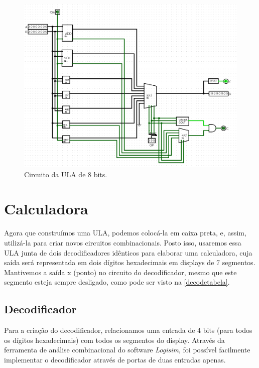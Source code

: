 \documentclass[
	12pt,				%
	openright,			%
	twoside,			%
	a4paper,			%
	english,			%
	french,				%
	spanish,			%
	brazil,				%
	]{abntex2}
\begin{document}
\begin{figure}[H]
	\begin{center}
	    \includegraphics[scale=0.4]{alu8.png}
	\end{center}
\caption{\label{ula8}Circuito da ULA de 8 bits.}
\end{figure}



\chapter{Calculadora}

Agora que construímos uma ULA, podemos colocá-la em caixa preta, e, assim, utilizá-la para criar novos circuitos combinacionais. Posto isso, usaremos essa ULA junta de dois decodificadores idênticos para elaborar uma calculadora, cuja saída será representada em dois dígitos hexadecimais em displays de 7 segmentos. Mantivemos a saída x (ponto) no circuito do decodificador, mesmo que este segmento esteja sempre desligado, como pode ser visto na \autoref{decodetabela}.

\section{Decodificador}
Para a criação do decodificador, relacionamos uma entrada de 4 bits (para todos os dígitos hexadecimais) com todos os segmentos do display. Através da ferramenta de análise combinacional do software \textit{Logisim}, foi possível facilmente implementar o decodificador através de portas de duas entradas apenas. 
\end{document}
